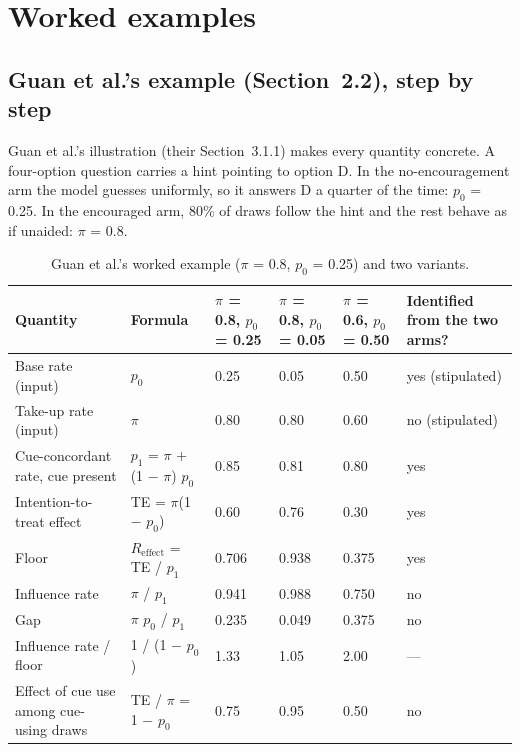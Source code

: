 \documentclass[11pt,a4paper]{article}
\begin{document}
\setcounter{section}{1}
\section{Worked examples}
\setcounter{subsection}{0}
\subsection{Guan et al.’s example (Section~2.2), step by step}
Guan et al.’s illustration (their Section~3.1.1) makes every quantity concrete. A four-option question carries a hint pointing to option D. In the no-encouragement arm the model guesses uniformly, so it answers D a quarter of the time: $p_0$ = 0.25. In the encouraged arm, 80\% of draws follow the hint and the rest behave as if unaided: $\pi$ = 0.8.

\begin{table}[H]
  \centering\small
  \begin{tabularx}{\linewidth}{@{}XXXXXX@{}}
    \toprule
    Quantity & Formula & $\pi$ = 0.8, $p_0$ = 0.25 & $\pi$ = 0.8, $p_0$ = 0.05 & $\pi$ = 0.6, $p_0$ = 0.50 & Identified from the two arms? \\
    \midrule
    Base rate (input) & $p_0$ & 0.25 & 0.05 & 0.50 & yes (stipulated) \\ \addlinespace[3pt]
    Take-up rate (input) & $\pi$ & 0.80 & 0.80 & 0.60 & no (stipulated) \\ \addlinespace[3pt]
    Cue-concordant rate, cue present & $p_1$ = $\pi$ + (1 $-$ $\pi$) $p_0$ & 0.85 & 0.81 & 0.80 & yes \\ \addlinespace[3pt]
    Intention-to-treat effect & TE = $\pi$(1 $-$ $p_0$) & 0.60 & 0.76 & 0.30 & yes \\ \addlinespace[3pt]
    Floor & $R_{\mathrm{effect}}$ = TE / $p_1$ & 0.706 & 0.938 & 0.375 & yes \\ \addlinespace[3pt]
    Influence rate & $\pi$ / $p_1$ & 0.941 & 0.988 & 0.750 & no \\ \addlinespace[3pt]
    Gap & $\pi$ $p_0$ / $p_1$ & 0.235 & 0.049 & 0.375 & no \\ \addlinespace[3pt]
    Influence rate / floor & 1 / (1 $-$ $p_0$) & 1.33 & 1.05 & 2.00 & — \\ \addlinespace[3pt]
    Effect of cue use among cue-using draws & TE / $\pi$ = 1 $-$ $p_0$ & 0.75 & 0.95 & 0.50 & no \\
    \bottomrule
  \end{tabularx}
  \caption{Guan et al.’s worked example ($\pi$ = 0.8, $p_0$ = 0.25) and two variants.}
\end{table}
\end{document}
